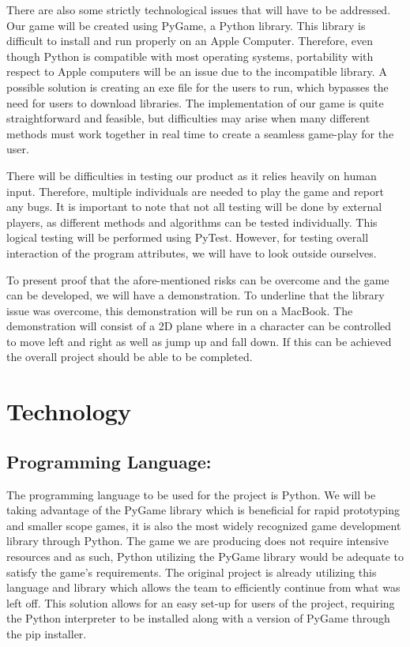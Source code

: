 \documentclass{article}
\begin{document}
There are also some strictly technological issues that will have to be
addressed. Our game will be created using PyGame, a Python library. This library
is difficult to install and run properly on an Apple Computer. Therefore, even
though Python is compatible with most operating systems, portability with
respect to Apple computers will be an issue due to the incompatible library. A
possible solution is creating an exe file for the users to run, which bypasses
the need for users to download libraries. The implementation of our game is
quite straightforward and feasible, but difficulties may arise when many
different methods must work together in real time to create a seamless game-play
for the user.

There will be difficulties in testing our product as it relies heavily on human
input. Therefore, multiple individuals are needed to play the game and report
any bugs. It is important to note that not all testing will be done by external
players, as different methods and algorithms can be tested individually. This
logical testing will be performed using PyTest. However, for testing overall
interaction of the program attributes, we will have to look outside ourselves.

To present proof that the afore-mentioned risks can be overcome and the game can
be developed, we will have a demonstration. To underline that the library issue
was overcome, this demonstration will be run on a MacBook. The demonstration
will consist of a 2D plane where in a character can be controlled to move left
and right as well as jump up and fall down. If this can be achieved the overall project should be able to be completed.

\section{Technology}

\subsection*{Programming Language:}

The programming language to be used for the project is Python. We will be taking
advantage of the PyGame library which is beneficial for rapid prototyping and
smaller scope games, it is also the most widely recognized game development
library through Python. The game we are producing does not require intensive
resources and as such, Python utilizing the PyGame library would be adequate to
satisfy the game’s requirements. The original project is already utilizing this
language and library which allows the team to efficiently continue from what was
left off. This solution allows for an easy set-up for users of the project,
requiring the Python interpreter to be installed along with a version of PyGame
through the pip installer.
\end{document}
